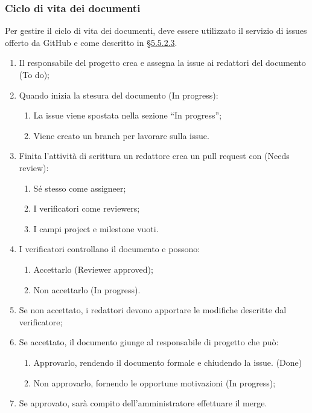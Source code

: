 \subsubsection{Ciclo di vita dei documenti}
Per gestire il ciclo di vita dei documenti, deve essere utilizzato il servizio di issues offerto da GitHub e come descritto in \hyperref[sec:projectboard]{§5.5.2.3}.
\begin{enumerate}
\item Il responsabile del progetto crea e assegna la issue ai redattori del documento (To do);
\item Quando inizia la stesura del documento (In progress):
	\begin{enumerate}
		\item La issue viene spostata nella sezione “In progress”;
		\item Viene creato un branch per lavorare sulla issue.
	\end{enumerate}
\item Finita l'attività di scrittura un redattore crea un {pull request} con (Needs review):
	\begin{enumerate}
		\item Sé stesso come assigneer;
		\item I verificatori come reviewers;
		\item I campi project e milestone vuoti.
	\end{enumerate} 
\item I verificatori controllano il documento e possono:
	\begin{enumerate}
	 	\item Accettarlo (Reviewer approved);
	 	\item Non accettarlo (In progress).
	\end{enumerate}
\item Se non accettato, i redattori devono apportare le modifiche descritte dal verificatore;
\item Se accettato, il documento giunge al responsabile di progetto che può:
\begin{enumerate}
	\item Approvarlo, rendendo il documento formale e chiudendo la issue. (Done)
	\item Non approvarlo, fornendo le opportune motivazioni (In progress);
\end{enumerate}
\item Se approvato, sarà compito dell'amministratore effettuare il merge.
\end{enumerate}
